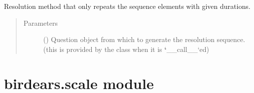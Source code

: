\documentclass[letterpaper,10pt,english]{sphinxmanual}
\begin{document}

\begin{fulllineitems}
\label{\detokenize{birdears:birdears.resolution.repeat_only}}
Resolution method that only repeats the sequence elements with given
durations.
\begin{quote}\begin{description}
\item[{Parameters}] \leavevmode
{} () \textendash{} Question object from which to generate the
resolution sequence. (this is provided by the  class
when it is {\color{red}\bfseries{}{}`}\_\_call\_\_{}`ed)

\end{description}\end{quote}

\end{fulllineitems}



\section{birdears.scale module}
\label{\detokenize{birdears:module-birdears.scale}}\label{\detokenize{birdears:birdears-scale-module}}
\end{document}

